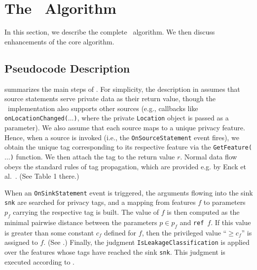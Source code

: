 \section{The \Tool\ Algorithm}\label{Se:bayesalg}

In this section, we describe the complete \Tool\ algorithm. We then discuss enhancements of the core algorithm.

\subsection{Pseudocode Description}\label{Se:pseudo}

 summarizes the main steps of \Tool. For simplicity, the description in  assumes that source statements serve private data as their return value, though the \Tool\ implementation also supports other sources (e.g., callbacks like \texttt{onLocationChanged($\ldots$)}, where the private \texttt{Location} object is passed as a parameter). We also assume that each source maps to a unique privacy feature. Hence, when a source is invoked (i.e., the \texttt{OnSourceStatement} event fires), we obtain the unique tag corresponding to its respective feature via the 
\texttt{GetFeature($\ldots$)} function. We then attach the tag to the return value $r$. Normal data flow obeys the standard rules of tag propagation, which 
are provided e.g. by Enck et al.~\cite{EGCCJMS:OSDI10}. (See Table 1 there.)

When an \texttt{OnSinkStatement} event is triggered, the arguments flowing into the sink \texttt{snk} are searched for privacy tags, and a mapping from features $f$ to parameters $p_f$ carrying the respective tag is built. The value of $f$  is then computed as the minimal pairwise distance between the parameters $p \in p_f$
and {\tt ref}\ $f$. If this value is greater than some constant $c_f$ defined for $f$, then the privileged value ``$\geq c_f$'' is assigned to $f$. (See .) Finally, the judgment \texttt{IsLeakageClassification} is applied over the features whose tags have reached the sink \texttt{snk}. This judgment is executed according to .

